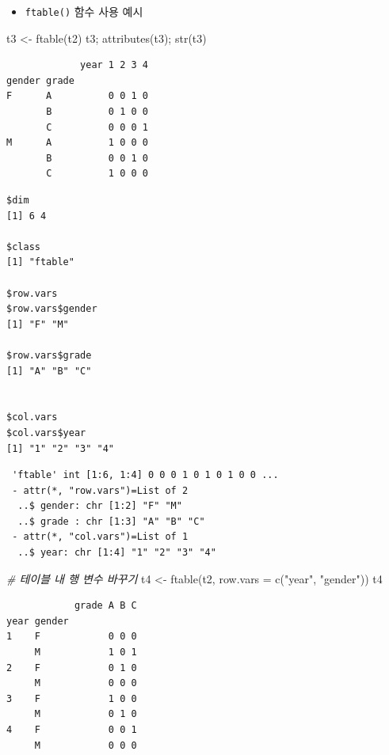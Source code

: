 \documentclass[
  11pt,
]{krantz}
\newenvironment{Shaded}{\begin{snugshade}}{\end{snugshade}}
\newcommand{\AttributeTok}[1]{\textcolor[rgb]{0.61,0.61,0.61}{#1}}
\newcommand{\CommentTok}[1]{\textcolor[rgb]{0.37,0.37,0.37}{\textit{#1}}}
\newcommand{\FunctionTok}[1]{\textcolor[rgb]{0,0,0}{#1}}
\newcommand{\NormalTok}[1]{#1}
\newcommand{\OtherTok}[1]{\textcolor[rgb]{0.37,0.37,0.37}{#1}}
\newcommand{\StringTok}[1]{\textcolor[rgb]{0.5,0.5,0.5}{#1}}
\providecommand{\tightlist}{%
  \setlength{\itemsep}{0pt}\setlength{\parskip}{0pt}}
\begin{document}
\normalsize

\begin{itemize}
\tightlist
\item
  \texttt{ftable()} 함수 사용 예시
\end{itemize}

\footnotesize

\begin{Shaded}
\begin{Highlighting}[]
\NormalTok{t3 }\OtherTok{\textless{}{-}} \FunctionTok{ftable}\NormalTok{(t2)}
\NormalTok{t3; }\FunctionTok{attributes}\NormalTok{(t3); }\FunctionTok{str}\NormalTok{(t3)}
\end{Highlighting}
\end{Shaded}

\begin{verbatim}
             year 1 2 3 4
gender grade             
F      A          0 0 1 0
       B          0 1 0 0
       C          0 0 0 1
M      A          1 0 0 0
       B          0 0 1 0
       C          1 0 0 0
\end{verbatim}

\begin{verbatim}
$dim
[1] 6 4

$class
[1] "ftable"

$row.vars
$row.vars$gender
[1] "F" "M"

$row.vars$grade
[1] "A" "B" "C"


$col.vars
$col.vars$year
[1] "1" "2" "3" "4"
\end{verbatim}

\begin{verbatim}
 'ftable' int [1:6, 1:4] 0 0 0 1 0 1 0 1 0 0 ...
 - attr(*, "row.vars")=List of 2
  ..$ gender: chr [1:2] "F" "M"
  ..$ grade : chr [1:3] "A" "B" "C"
 - attr(*, "col.vars")=List of 1
  ..$ year: chr [1:4] "1" "2" "3" "4"
\end{verbatim}

\begin{Shaded}
\begin{Highlighting}[]
\CommentTok{\# 테이블 내 행 변수 바꾸기}
\NormalTok{t4 }\OtherTok{\textless{}{-}} \FunctionTok{ftable}\NormalTok{(t2, }\AttributeTok{row.vars =} \FunctionTok{c}\NormalTok{(}\StringTok{"year"}\NormalTok{, }\StringTok{"gender"}\NormalTok{))}
\NormalTok{t4}
\end{Highlighting}
\end{Shaded}

\begin{verbatim}
            grade A B C
year gender            
1    F            0 0 0
     M            1 0 1
2    F            0 1 0
     M            0 0 0
3    F            1 0 0
     M            0 1 0
4    F            0 0 1
     M            0 0 0
\end{verbatim}
\end{document}
